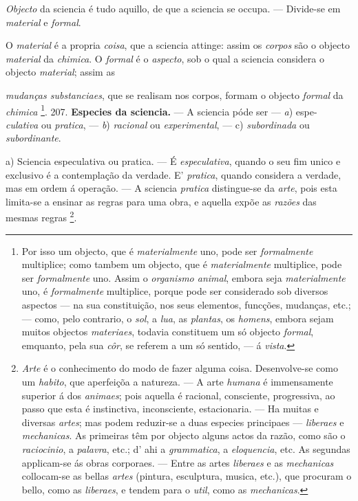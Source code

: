 
 
\emph{Objecto} da sciencia é tudo aquillo, de que a sciencia se occupa. --- Divide-se em \emph{material} e \emph{formal}.

O \emph{material} é a propria \emph{coisa}, que a sciencia attinge: assim os \emph{corpos} são o objecto \emph{material} da \emph{chimica}. O \emph{formal} é o \emph{aspecto}, sob o qual a sciencia considera o objecto \emph{material}; assim as

\emph{mudanças substanciaes}, que se realisam nos corpos, formam o objecto \emph{formal} da \emph{chimica} \footnote{Por isso um objecto, que é \emph{materialmente} uno, pode ser \emph{formalmente} multiplice; como tambem um objecto, que é \emph{materialmente} multiplice, pode ser \emph{formalmente} uno. Assim o \emph{organismo animal}, embora seja \emph{materialmente} uno, é \emph{formalmente} multiplice, porque pode ser considerado sob diversos aspectos --- na sua constituição, nos seus elementos, funcções, mudanças, etc.; --- como, pelo contrario, o \emph{sol}, a \emph{lua}, as \emph{plantas}, os \emph{homens}, embora sejam muitos objectos \emph{materiaes}, todavia constituem um só objecto \emph{formal}, emquanto, pela sua \emph{côr}, se referem a um só sentido, --- á \emph{vista}.}. 207. \textbf{Especies da sciencia.} --- A sciencia póde ser --- \emph{a}) espe-   \emph{culativa} ou \emph{pratica}, --- \emph{b}) \emph{racional} ou \emph{experimental}, --- c) \emph{subordinada} ou \emph{subordinante}.

a) Sciencia especulativa ou pratica. --- É \emph{especulativa}, quando o seu fim unico e exclusivo é a contemplação da verdade. E' \emph{pratica}, quando considera a verdade, mas em ordem á operação. --- A sciencia \emph{pratica} distingue-se da \emph{arte}, pois esta limita-se a ensinar as regras para uma obra, e aquella expõe as \emph{razões} das mesmas regras \footnote{\emph{Arte} é o conhecimento do modo de fazer alguma coisa. Desenvolve-se como um \emph{habito}, que aperfeiçõa a natureza. --- A arte \emph{humana} é immensamente superior á dos \emph{animaes}; pois aquella é racional, consciente, progressiva, ao passo que esta é instinctiva, inconsciente, estacionaria. --- Ha muitas e diversas \emph{artes}; mas podem reduzir-se a duas especies principaes --- \emph{liberaes} e \emph{mechanicas}. As primeiras têm por objecto alguns actos da razão, como são o \emph{raciocinio}, a \emph{palavra}, etc.; d' ahi a \emph{grammatica}, a \emph{eloquencia}, etc. As segundas applicam-se ás obras corporaes. --- Entre as artes \emph{liberaes} e as \emph{mechanicas} collocam-se as bellas \emph{artes} (pintura, esculptura, musica, etc.), que procuram o bello, como as \emph{liberaes}, e tendem para o \emph{util}, como as \emph{mechanicas}.}.

